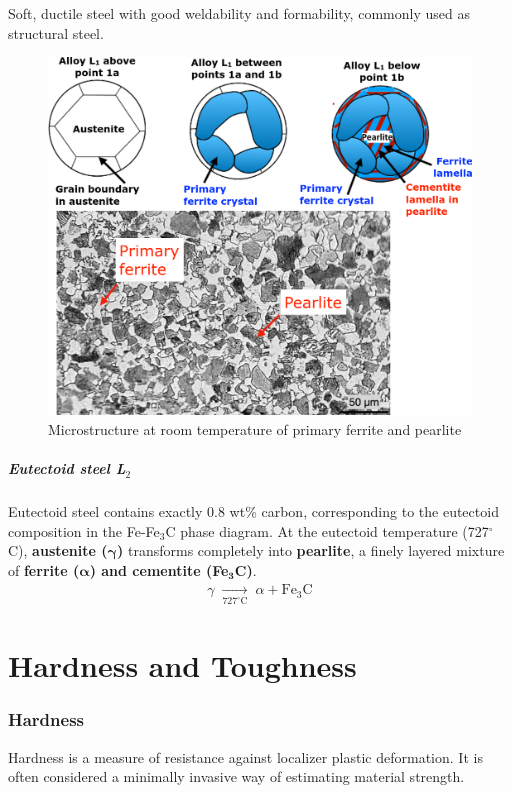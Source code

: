 \documentclass{article}
\begin{document}
Soft, ductile steel with good weldability and formability, commonly used as structural steel.

\begin{figure}[ht!]
  \centering
  \includegraphics[width=.7\textwidth]{media/hypoeutectic_microstructure.png}
  \caption*{Microstructure at room temperature of primary ferrite and pearlite}
\end{figure}

\newpage
\subsubsection{Eutectoid steel L$_2$}
Eutectoid steel contains exactly 0.8 wt\% carbon, corresponding to the eutectoid composition
in the Fe-Fe$_3$C phase diagram. At the eutectoid temperature (727$^\circ$C), \textbf{austenite ($\bm{\gamma}$)}
transforms completely into \textbf{pearlite}, a finely layered mixture of
\textbf{ferrite ($\bm{\alpha}$) and cementite (Fe$_\mathbf{3}$C)}.
\begin{gather*}
  \gamma \;\xrightarrow[727^{\circ}\text{C}]{}\; \alpha + \mathrm{Fe}_3\mathrm{C}
\end{gather*}





\newpage
\part{Hardness and Toughness}
\section{Hardness}
Hardness is a measure of resistance against localizer plastic deformation. It is often
considered a minimally invasive way of estimating material strength.
\end{document}

